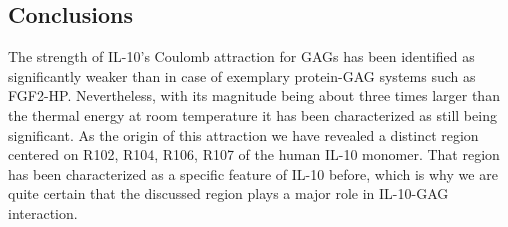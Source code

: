 
\subsection{Conclusions}
The strength of IL-10's Coulomb attraction for GAGs has been identified as
significantly weaker than in case of exemplary protein-GAG systems such as
FGF2-HP. Nevertheless, with its magnitude being about three times larger than
the thermal energy at room temperature it has been characterized as still being
significant. As the origin of this attraction we have revealed a distinct region
centered on R102, R104, R106, R107 of the human IL-10 monomer. That region has
been characterized as a specific feature of IL-10 before, which is why we are
quite certain that the discussed region plays a major role in IL-10-GAG
interaction.